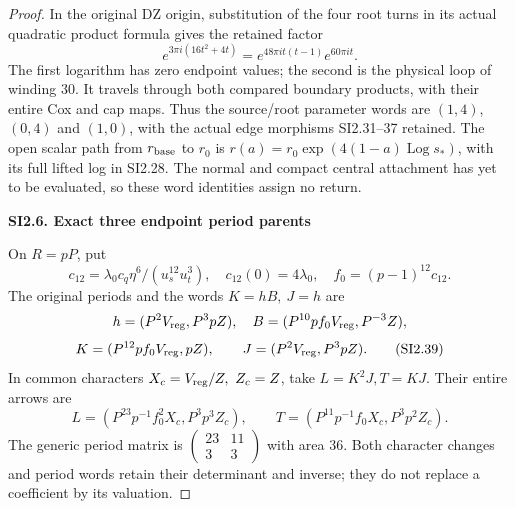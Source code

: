 \begin{proof}
In the original DZ origin, substitution of the four root turns
in its actual quadratic product formula gives the retained factor
\[
 e^{3\pi i(16t^2+4t)}
   =e^{48\pi it(t-1)}e^{60\pi it}.
 \tag{SI2.37}
\]
The first logarithm has zero endpoint values; the second is the
physical loop of winding \(30\). It travels through both compared
boundary products, with their entire Cox and cap maps.
Thus the source/root parameter words are \((1,4)\), \((0,4)\)
and \((1,0)\), with the actual edge morphisms SI2.31--37 retained.
The open scalar path from \(r_{\rm base}\) to \(r_0\) is
\(r(a)=r_0\exp(4(1-a)\operatorname{Log}s_*)\), with its full lifted
log in SI2.28. The normal and compact central attachment has yet
to be evaluated, so these word identities assign no return.

\par

\medskip\noindent\textbf{SI2.6. Exact three endpoint period parents}

\par\nobreak

On \(R=pP\), put
\[
 c_{12}=\lambda_0c_q\eta^6/(u_s^{12}u_t^3),\quad
 c_{12}(0)=4\lambda_0,\quad f_0=(p-1)^{12}c_{12}.
 \tag{SI2.38}
\]
The original periods and the words \(K=hB,\ J=h\) are
\[
 h=(P^2V_{\rm reg},P^3pZ),\quad
 B=(P^{10}p f_0V_{\rm reg},P^{-3}Z),
\]
\[
 K=(P^{12}p f_0V_{\rm reg},pZ),\qquad
 J=(P^2V_{\rm reg},P^3pZ).
 \tag{SI2.39}
\]
In common characters \(X_c=V_{\rm reg}/Z,\ Z_c=Z\), take
\(L=K^2J,T=KJ\). Their entire arrows are
\[
 L=(P^{23}p^{-1}f_0^2X_c,P^3p^3Z_c),\qquad
 T=(P^{11}p^{-1}f_0X_c,P^3p^2Z_c).
 \tag{SI2.40}
\]
The generic period matrix is
\(\left(\begin{smallmatrix}23&11\\3&3\end{smallmatrix}\right)\)
with area \(36\). Both character changes and period words retain
their determinant and inverse; they do not replace a coefficient
by its valuation.


\end{proof}
